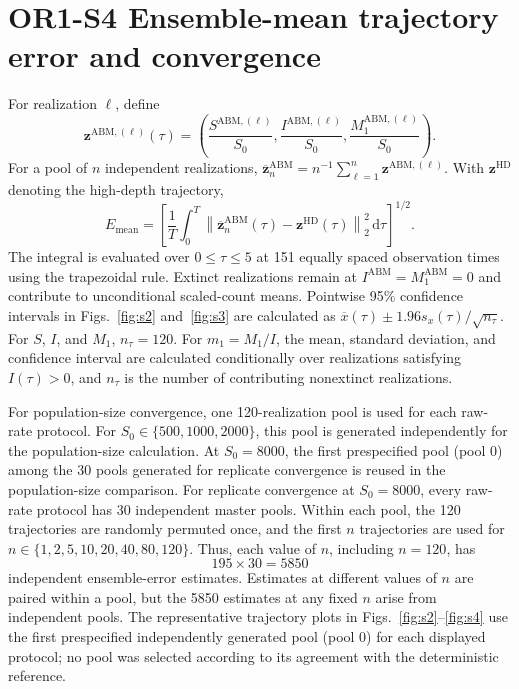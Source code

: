 \documentclass[11pt]{article}
\begin{document}
\section*{OR1-S4 Ensemble-mean trajectory error and convergence}
For realization $\ell$, define
\[
\mathbf z^{\mathrm{ABM},(\ell)}(\tau)=\left(\frac{S^{\mathrm{ABM},(\ell)}}{S_0},\frac{I^{\mathrm{ABM},(\ell)}}{S_0},\frac{M_1^{\mathrm{ABM},(\ell)}}{S_0}\right).
\]
For a pool of $n$ independent realizations, $\overline{\mathbf z}_n^{\mathrm{ABM}}=n^{-1}\sum_{\ell=1}^n\mathbf z^{\mathrm{ABM},(\ell)}$. With $\mathbf z^{\mathrm{HD}}$ denoting the high-depth trajectory,
\[
E_{\mathrm{mean}}=\left[\frac1T\int_0^T\left\|\overline{\mathbf z}_n^{\mathrm{ABM}}(\tau)-\mathbf z^{\mathrm{HD}}(\tau)\right\|_2^2\,\mathrm d\tau\right]^{1/2}.
\]
The integral is evaluated over $0\leq\tau\leq5$ at 151 equally spaced observation times using the trapezoidal rule. Extinct realizations remain at $I^{\mathrm{ABM}}=M_1^{\mathrm{ABM}}=0$ and contribute to unconditional scaled-count means. Pointwise 95\% confidence intervals in Figs.~\ref{fig:s2} and~\ref{fig:s3} are calculated as $\overline{x}(\tau)\pm1.96s_x(\tau)/\sqrt{n_\tau}$. For $S$, $I$, and $M_1$, $n_\tau=120$. For $m_1=M_1/I$, the mean, standard deviation, and confidence interval are calculated conditionally over realizations satisfying $I(\tau)>0$, and $n_\tau$ is the number of contributing nonextinct realizations.

For population-size convergence, one 120-realization pool is used for each raw-rate protocol. For $S_0\in\{500,1000,2000\}$, this pool is generated independently for the population-size calculation. At $S_0=8000$, the first prespecified pool (pool 0) among the 30 pools generated for replicate convergence is reused in the population-size comparison. For replicate convergence at $S_0=8000$, every raw-rate protocol has 30 independent master pools. Within each pool, the 120 trajectories are randomly permuted once, and the first $n$ trajectories are used for $n\in\{1,2,5,10,20,40,80,120\}$. Thus, each value of $n$, including $n=120$, has
\[
195\times30=5850
\]
independent ensemble-error estimates. Estimates at different values of $n$ are paired within a pool, but the 5850 estimates at any fixed $n$ arise from independent pools. The representative trajectory plots in Figs.~\ref{fig:s2}--\ref{fig:s4} use the first prespecified independently generated pool (pool 0) for each displayed protocol; no pool was selected according to its agreement with the deterministic reference.
\end{document}
